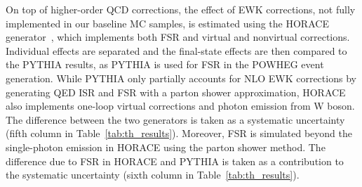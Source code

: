 On top of higher-order QCD corrections, the effect of EWK corrections, not fully 
implemented in our baseline MC samples, is estimated using the {\sc HORACE} generator~\cite{HORACE-1, HORACE-2, HORACE-3, HORACE-4},
which implements both FSR and virtual and nonvirtual corrections. 
Individual effects are separated and the final-state effects
are then compared to the {\sc PYTHIA} results, as {\sc PYTHIA} is used for FSR in the 
{\sc POWHEG} event generation. While {\sc PYTHIA} only partially accounts for NLO EWK corrections 
by generating QED ISR and FSR with a parton shower approximation, HORACE also implements one-loop
virtual corrections and photon emission from W boson. The difference between the two generators is taken
as a systematic uncertainty (fifth column in Table~\ref{tab:th_results}). Moreover, FSR is simulated beyond the
single-photon emission in HORACE using the parton shower method. The difference due to FSR in HORACE and
PYTHIA is taken as a contribution to the systematic uncertainty (sixth column in Table~\ref{tab:th_results}). 


